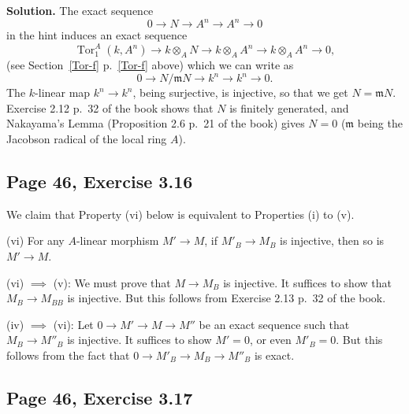 \documentclass[parskip=half,fontsize=12pt]{scrartcl}%
\newcommand{\mf}{\mathfrak}
\newcommand{\mmm}{\mf m}
\newcommand{\Tor}{\operatorname{Tor}}
\begin{document}
\textbf{Solution.} The exact sequence 
$$
0\to N\to A^n\to A^n\to0
$$ 
in the hint induces an exact sequence 
$$
\Tor^A_1(k,A^n)\to k\otimes_AN\to k\otimes_AA^n\to k\otimes_AA^n\to0,
$$ 
(see Section~\ref{Tor-f} p.~\ref{Tor-f} above) which we can write as 
$$
0\to N/\mmm N\to k^n\to k^n\to0.%
$$ 
The $k$-linear map $k^n\to k^n$, being surjective, is injective, so that we get $N=\mmm N$. Exercise 2.12 p.~32 of the book shows that $N$ is finitely generated, and Nakayama’s Lemma (Proposition 2.6 p.~21 of the book) gives $N=0$ ($\mmm$ being the Jacobson radical of the local ring $A$). 

%
\begin{comment}
We follow Jeffrey Daniel Kasik Carlson. 

The exact sequence 
$$
0\to N\to F\to F\to0
$$ 
in the hint of the book induces an exact sequence 
$$
k\otimes N\to k\otimes F\to k\otimes F\to0,
$$ 
which we can write as 
$$
N/\mmm N\to k^n\to k^n\to0.
$$ 
Now Exercise 2.12 p.~32 of the book shows that $N$ is finitely generated. %
The map $k^n\to k^n$ is a surjection of vector spaces of the same dimension, hence an isomorphism. This implies $N=\mmm N$, and Nakayama’s Lemma (Proposition 2.6 p.~21 of the book) gives $N=0$ ($\mmm$ being the Jacobson radical of the local ring $A$). Thus our endomorphism of $F$ is injective. 
\end{comment}
%

\subsection{Page 46, Exercise 3.16}\label{316}%

We claim that Property (vi) below is equivalent to Properties (i) to (v).

(vi) For any $A$-linear morphism $M'\to M$, if $M'_B\to M_B$ is injective, then so is $M'\to M$.

(vi) $\implies$ (v): We must prove that $M\to M_B$ is injective. It suffices to show that $M_B\to M_{BB}$ is injective. But this follows from Exercise 2.13 p.~32 of the book.

(iv) $\implies$ (vi): Let $0\to M'\to M\to M''$ be an exact sequence such that $M_B\to M''_B$ is injective. It suffices to show $M'=0$, or even $M'_B=0$. But this follows from the fact that $0\to M'_B\to M_B\to M''_B$ is exact.

\subsection{Page 46, Exercise 3.17}%
\end{document}
